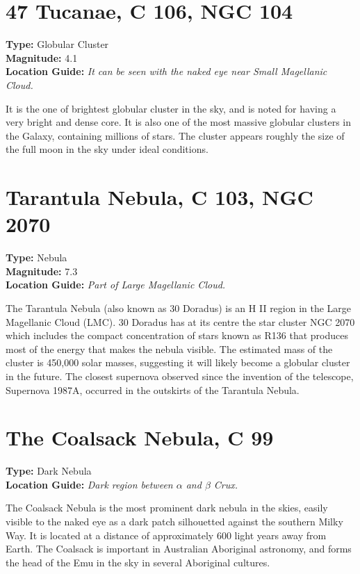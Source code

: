 \section{47 Tucanae, C 106, NGC 104}
\textbf{Type:} Globular Cluster \\
\textbf{Magnitude:} 4.1 \\ 
\textbf{Location Guide:} \textit{It can be seen with the naked eye near Small Magellanic Cloud.}

It is the one of brightest globular cluster in the sky, and is noted for having a very bright and dense core. It is also one of the most massive globular clusters in the Galaxy, containing millions of stars. The cluster appears roughly the size of the full moon in the sky under ideal conditions.

\section{Tarantula Nebula, C 103, NGC 2070}
\textbf{Type:} Nebula \\
\textbf{Magnitude:} 7.3 \\ 
\textbf{Location Guide:} \textit{Part of Large Magellanic Cloud.}

The Tarantula Nebula (also known as 30 Doradus) is an H II region in the Large Magellanic Cloud (LMC). 30 Doradus has at its centre the star cluster NGC 2070 which includes the compact concentration of stars known as R136 that produces most of the energy that makes the nebula visible. The estimated mass of the cluster is 450,000 solar masses, suggesting it will likely become a globular cluster in the future\cite{2009AJ....137.3437B}. The closest supernova observed since the invention of the telescope, Supernova 1987A, occurred in the outskirts of the Tarantula Nebula.

\section{The Coalsack Nebula, C 99}
\textbf{Type:} Dark Nebula \\
\textbf{Location Guide:} \textit{Dark region between $\alpha$ and $\beta$ Crux.}

The Coalsack Nebula is the most prominent dark nebula in the skies, easily visible to the naked eye as a dark patch silhouetted against the southern Milky Way. It is located at a distance of approximately 600 light years away from Earth. The Coalsack is important in Australian Aboriginal astronomy, and forms the head of the Emu in the sky in several Aboriginal cultures. 

